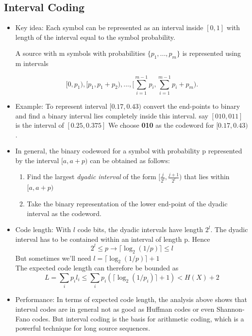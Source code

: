 \documentclass[12pt]{article}
\begin{document}
\subsection{Interval Coding}
\begin{itemize}
\item Key idea: Each symbol can be represented as an interval inside $[0,1]$ with length of the interval equal to the symbol probability. 

A source with m symbols with probabilities $\{ p_1,...,p_m\}$ is represented using m intervals 

\[
[0,p_1), [p_1, p_1+p_2),...,[\sum_{i=1}^{m-1}p_i, \sum_{i=1}^{m-1}p_i + p_m).
\]
\item Example: To represent interval $[0.17,0.43)$ convert the end-points to binary and find a binary interval lies completely inside this interval. say $[010,011]$ is the interval of $[0.25,0.375]$ We choose \textbf{010} as the codeword for $[0.17,0.43)$.

\item In general, the binary codeword for a symbol with probability p represented by the interval $[a,a+p)$ can be obtained as follows:
\begin{enumerate}
\item Find the largest \textit{dyadic interval} of the form $[\frac{j}{2^{\mathit{l}}}, \frac{j+1}{2^{\mathit{l}}})$ that lies within $[a,a+p)$
\item Take the binary representation of the lower end-point of the dyadic interval as the codeword.
\end{enumerate}
\item Code length: With $\mathit{l}$ code bits, the dyadic intervals have length $2^\mathit{l}$. The dyadic interval has to be contained within an interval of length p. Hence 
\[
2^\mathit{l} \le p \rightarrow \lceil \log_2(1/p) \rceil \le \mathit{l}
\]
But sometimes we'll need $\mathit{l} =\lceil \log_2(1/p) \rceil +1 $ \\
The expected code length can therefore be bounded as 
\[
L = \sum_i p_i\mathit{l}_i \le \sum_i p_i (\lceil \log_2(1/p_i) \rceil +1) < H(X) + 2
\]
\item Performance: In terms of expected code length, the analysis above shows that interval codes are in general not as good as Huffman codes or even Shannon-Fano codes. But interval coding is the basis for arithmetic coding, which is a powerful technique for long source sequences.

\end{itemize}
\end{document}
